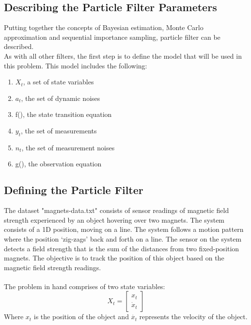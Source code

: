 \documentclass[12pt]{article}
\begin{document}
\subsection{Describing the Particle Filter Parameters}
Putting together the concepts of Bayesian estimation, Monte Carlo approximation and sequential importance sampling, particle filter can be described. \\
As with all other filters, the first step is to define the model that will be used in this problem. This model includes the following: 
\begin{enumerate}
\item $X_t$, a set of state variables
\item $a_t$, the set of dynamic noises
\item f(), the state transition equation
\item $y_t$, the set of measurements
\item $n_t$, the set of measurement noises
\item g(), the observation equation
\end{enumerate}

\subsection{Defining the Particle Filter}
The dataset "magnets-data.txt" consists of sensor readings of magnetic field strength experienced by an object hovering over two magnets. The system consists of a 1D position, moving on a line. The system follows a motion pattern where the position `zig-zags' back and forth on a line. The sensor on the system detects a field strength that is the sum of the distances from two fixed-position magnets. The objective is to track the position of this object based on the magnetic field strength readings.\\
\\ 

The problem in hand comprises of two state variables:
\begin{equation}
X_t = \begin{bmatrix}
x_t \\
\dot{x}_t
\end{bmatrix}
\label{eq:States}
\end{equation}
Where $x_t$ is the position of the object and $\dot{x_t}$ represents the velocity of the object.\\  
\end{document}
